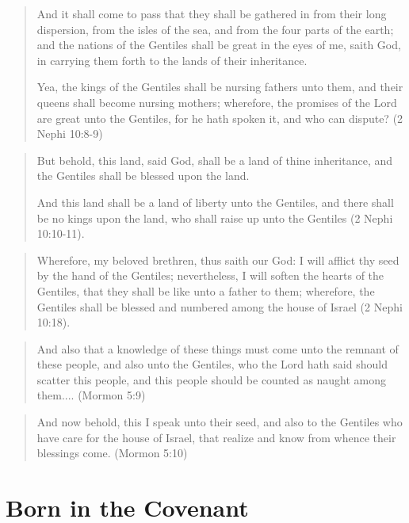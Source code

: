 \begin{quotation}
And it shall come to pass that they shall be gathered in from their long dispersion, from the isles of the sea, and from the four parts of the earth; and the nations of the Gentiles shall be great in the eyes of me, saith God, in carrying them forth to the lands of their inheritance.

Yea, the kings of the Gentiles shall be nursing fathers unto them, and their queens shall become nursing mothers; wherefore, the promises of the Lord are great unto the Gentiles, for he hath spoken it, and who can dispute? (2 Nephi 10:8-9)
\end{quotation}

\begin{quotation}
But behold, this land, said God, shall be a land of thine inheritance, and the Gentiles shall be blessed upon the land.

And this land shall be a land of liberty unto the Gentiles, and there shall be no kings upon the land, who shall raise up unto the Gentiles (2 Nephi 10:10-11).
\end{quotation}

\begin{quotation}
Wherefore, my beloved brethren, thus saith our God: I will afflict thy seed by the hand of the Gentiles; nevertheless, I will soften the hearts of the Gentiles, that they shall be like unto a father to them; wherefore, the Gentiles shall be blessed and numbered among the house of Israel (2 Nephi 10:18).
\end{quotation}

\begin{quotation}
And also that a knowledge of these things must come unto the remnant of these people, and also unto the Gentiles, who the Lord hath said should scatter this people, and this people should be counted as naught among them.... (Mormon 5:9)
\end{quotation}

\begin{quotation}
And now behold, this I speak unto their seed, and also to the Gentiles who have care for the house of Israel, that realize and know from whence their blessings come. (Mormon 5:10)
\end{quotation}

\section{Born in the Covenant}

